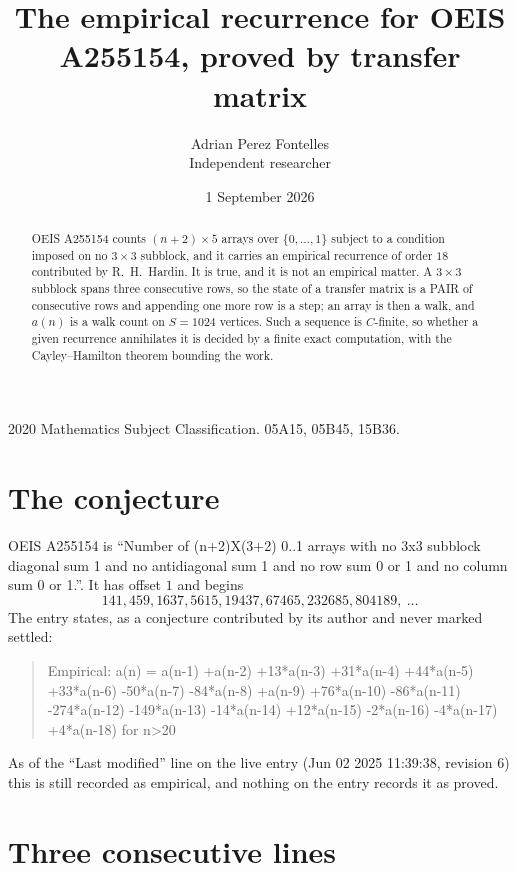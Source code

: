 \documentclass[11pt,a4paper]{article}
\title{The empirical recurrence for OEIS A255154, proved by transfer matrix}
\author{Adrian Perez Fontelles\\ \small Independent researcher}
\date{1 September 2026}
\theoremstyle{plain}
\theoremstyle{definition}
\begin{document}
\maketitle

\begin{abstract}
OEIS A255154 counts $(n+2)\times5$ arrays over $\{0,\dots,1\}$ subject to a condition imposed on
no $3\times3$ subblock, and it carries an empirical recurrence of order $18$
contributed by R.~H.~Hardin. It is true, and it is not an empirical matter. A $3\times3$
subblock spans three consecutive rows, so the state of a transfer matrix is a PAIR of
consecutive rows and appending one more row is a step; an array is then a walk, and
$a(n)$ is a walk count on $S=1024$ vertices. Such a sequence is $C$-finite, so whether a given
recurrence annihilates it is decided by a finite exact computation, with the Cayley--Hamilton
theorem bounding the work.
\end{abstract}

\noindent\small 2020 Mathematics Subject Classification. 05A15, 05B45, 15B36.\normalsize

\section{The conjecture}

OEIS A255154 is ``Number of (n+2)X(3+2) 0..1 arrays with no 3x3 subblock diagonal sum 1 and no antidiagonal sum 1 and no row sum 0 or 1 and no column sum 0 or 1.''. It has offset $1$ and begins
\[
141, 459, 1637, 5615, 19437, 67465, 232685, 804189,\ \dots
\]
The entry states, as a conjecture contributed by its author and never marked settled:
\begin{quote}
Empirical: a(n) = a(n-1) +a(n-2) +13*a(n-3) +31*a(n-4) +44*a(n-5) +33*a(n-6) -50*a(n-7) -84*a(n-8) +a(n-9) +76*a(n-10) -86*a(n-11) -274*a(n-12) -149*a(n-13) -14*a(n-14) +12*a(n-15) -2*a(n-16) -4*a(n-17) +4*a(n-18) for n>20
\end{quote}
As of the ``Last modified'' line on the live entry (Jun 02 2025 11:39:38, revision 6) this is still
recorded as empirical, and nothing on the entry records it as proved.

\section{Three consecutive lines}
\end{document}
